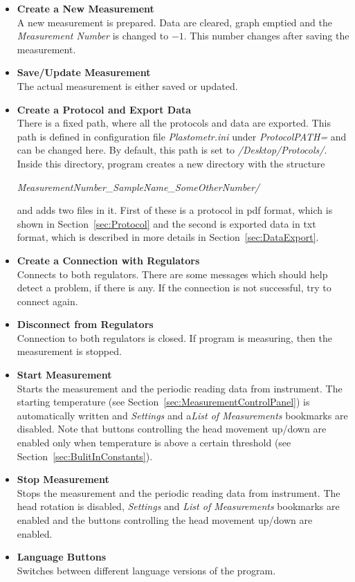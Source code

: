 \documentclass[a4paper,11pt,twoside]{book}
\theoremstyle{named}
\begin{document}
\begin{itemize}
  \item \textbf{Create a New Measurement} \\
    A new measurement is prepared. Data are cleared, graph emptied and the
    \textit{Measurement Number} is changed to $-1$. This number changes after
    saving the measurement. 
  \item \textbf{Save/Update Measurement} \\
    The actual measurement is either saved or updated.
  \item \textbf{Create a Protocol and Export Data} \\
    There is a fixed path, where all the protocols and data are exported. This
    path is defined in configuration file \textit{Plastometr.ini} under
    \textit{ProtocolPATH=} and can be changed here. By default, this path is set
    to \textit{/Desktop/Protocols/}. Inside this directory, program creates a
    new directory with the structure

    \textit{MeasurementNumber\_SampleName\_SomeOtherNumber/} 
    
    and adds two files in it. First of these is a protocol in pdf format,
    which is shown in Section~\ref{sec:Protocol} and the second is exported data
    in txt format, which is described in more details in
    Section~\ref{sec:DataExport}.  
  \item \textbf{Create a Connection with Regulators} \\
    Connects to both regulators. There are some messages which should help
    detect a problem, if there is any. If the connection is not successful, try
    to connect again.
  \item \textbf{Disconnect from Regulators} \\
    Connection to both regulators is closed. If program is measuring, then the
    measurement is stopped.
  \item \textbf{Start Measurement} \\
    Starts the measurement and the periodic reading data from instrument. The
    starting temperature (see Section~\ref{sec:MeasurementControlPanel}) is
    automatically written and \textit{Settings} and a\textit{List of
    Measurements} bookmarks are disabled. Note that buttons controlling the head
    movement up/down are enabled only when temperature is above a certain
    threshold (see Section~\ref{sec:BulitInConstants}).  
  \item \textbf{Stop Measurement} \\
    Stops the measurement and the periodic reading data from instrument. The
    head rotation is disabled, \textit{Settings} and \textit{List of
    Measurements} bookmarks are enabled and the buttons controlling the head
    movement up/down are enabled.  
  \item \textbf{Language Buttons} \\
    Switches between different language versions of the program. 
\end{itemize}
\end{document}
